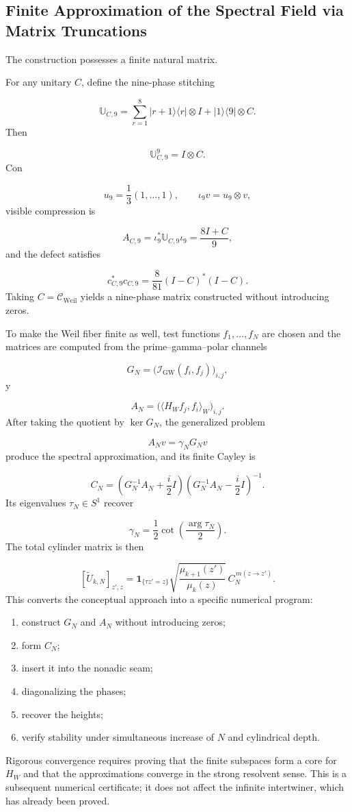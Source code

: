 \subsection{Finite Approximation of the Spectral Field via Matrix Truncations}
The construction possesses a finite natural matrix.\par
For any unitary \(C\), define the nine-phase stitching\par
\[
\mathbb U_{C,9}
=
\sum_{r=1}^{8}
|r+1\rangle\langle r|\otimes I
+
|1\rangle\langle9|\otimes C.
\]
Then\par
\[
\mathbb U_{C,9}^9
=
I\otimes C.
\]
Con\par
\[
u_9=\frac1{3}(1,\ldots,1),
\qquad
\iota_9v=u_9\otimes v,
\]
visible compression is\par
\[
A_{C,9}
=
\iota_9^*\mathbb U_{C,9}\iota_9
=
\frac{8I+C}{9},
\]
and the defect satisfies\par
\[
c_{C,9}^*c_{C,9}
=
\frac{8}{81}
(I-C)^*(I-C).
\]
Taking \(C=\mathcal C_{\mathrm{Weil}}\) yields a nine-phase matrix constructed without introducing zeros.\par
To make the Weil fiber finite as well, test functions \(f_1,\ldots,f_N\) are
chosen and the matrices are computed from the prime--gamma--polar channels\par
\[
G_N
=
\bigl(
\mathscr I_{\mathrm{GW}}(f_i,f_j)
\bigr)_{i,j},
\]
y\par
\[
A_N
=
\bigl(
\langle H_Wf_j,f_i\rangle_W
\bigr)_{i,j}.
\]
After taking the quotient by \(\ker G_N\), the generalized problem\par
\[
A_Nv=\gamma_NG_Nv
\]
produce the spectral approximation, and its finite Cayley is\par
\[
C_N
=
\left(
G_N^{-1}A_N+\frac{i}{2}I
\right)
\left(
G_N^{-1}A_N-\frac{i}{2}I
\right)^{-1}.
\]
Its eigenvalues \(\tau_N\in S^1\) recover\par
\[
\gamma_N
=
\frac12
\cot\left(
\frac{\arg\tau_N}{2}
\right).
\]
The total cylinder matrix is then\par
\[
[\widetilde U_{k,N}]_{z',z}
=
\mathbf1_{\{\tau z'=z\}}
\sqrt{\frac{\mu_{k+1}(z')}{\mu_k(z)}}
\,C_N^{\,m(z\to z')}.
\]
This converts the conceptual approach into a specific numerical program:\par
\begin{enumerate}
\item construct \(G_N\) and \(A_N\) without introducing zeros;
\item form \(C_N\);
\item insert it into the nonadic seam;
\item diagonalizing the phases;
\item recover the heights;
\item verify stability under simultaneous increase of \(N\) and cylindrical depth.
\end{enumerate}
Rigorous convergence requires proving that the finite subspaces form a core for \(H_W\) and that the approximations converge in the strong resolvent sense. This is a subsequent numerical certificate; it does not affect the infinite intertwiner, which has already been proved.\par
{}
